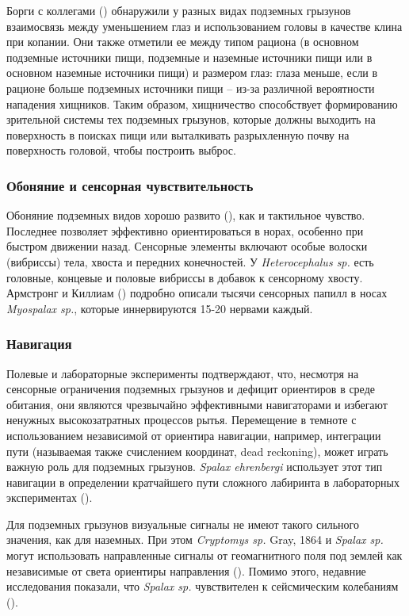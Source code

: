 Борги с коллегами (\cite{Borghi2002}) обнаружили у разных видах подземных грызунов взаимосвязь между уменьшением глаз и использованием головы в качестве клина при копании. Они также отметили ее между типом рациона (в основном подземные источники пищи, подземные и наземные источники пищи или в основном наземные источники пищи) и размером глаз: глаза меньше, если в рационе больше подземных источники пищи -- из-за различной вероятности нападения хищников. Таким образом, хищничество способствует формированию зрительной системы тех подземных грызунов, которые должны выходить на поверхность в поисках пищи или выталкивать разрыхленную почву на поверхность головой, чтобы построить выброс.

\subsubsection{Обоняние и сенсорная чувствительность}

Обоняние подземных видов хорошо развито (\cite{REICHMAN1990}), как и тактильное чувство. Последнее позволяет эффективно ориентироваться в норах, особенно при быстром движении назад. Сенсорные элементы включают особые волоски (вибриссы) тела, хвоста и передних конечностей. У \textit{Heterocephalus sp.} есть головные, концевые и половые вибриссы в добавок к сенсорному хвосту. Армстронг и Киллиам (\cite{ARMSTRONG1961}) подробно описали тысячи сенсорных папилл в носах \textit{Myospalax sp.}, которые иннервируются 15-20 нервами каждый. 

\subsubsection{Навигация}

Полевые и лабораторные эксперименты подтверждают, что, несмотря на сенсорные ограничения подземных грызунов и дефицит ориентиров в среде обитания, они являются чрезвычайно эффективными навигаторами и избегают ненужных высокозатратных процессов рытья. Перемещение в темноте с использованием независимой от ориентира навигации, например, интеграции пути (называемая также счислением координат, dead reckoning), может играть важную роль для подземных грызунов. \textit{Spalax ehrenbergi} использует этот тип навигации в определении кратчайшего пути сложного лабиринта в лабораторных экспериментах (\cite{Kimchi2004}).

Для подземных грызунов визуальные сигналы не имеют такого сильного значения, как для наземных. При этом \textit{Cryptomys sp.} Gray, 1864 и \textit{Spalax sp.} могут использовать направленные сигналы от геомагнитного поля под землей как независимые от света ориентиры направления (\cite{Kimchi2004}). Помимо этого, недавние исследования показали, что \textit{Spalax sp.} чувствителен к сейсмическим колебаниям (\cite{Heth1987}).

